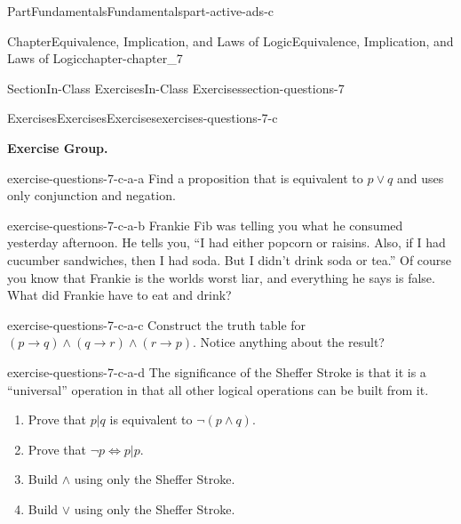 \documentclass[oneside,10pt,]{book}
\numberwithin{equation}{section}
\begin{document}
\begin{partptx}{Part}{Fundamentals}{}{Fundamentals}{}{}{part-active-ads-c}
\begin{chapterptx}{Chapter}{Equivalence, Implication, and Laws of Logic}{}{Equivalence, Implication, and Laws of Logic}{}{}{chapter-chapter_7}
%
%
\typeout{************************************************}
\typeout{************************************************}
%
\begin{sectionptx}{Section}{In-Class Exercises}{}{In-Class Exercises}{}{}{section-questions-7}
%
%
%
\typeout{************************************************}
\typeout{************************************************}
%
\begin{exercises-subsection-numberless}{Exercises}{Exercises}{}{Exercises}{}{}{exercises-questions-7-c}
\par\medskip\noindent%
\textbf{Exercise Group.}\space\space%
\begin{exercisegroup}
\begin{divisionexerciseeg}{1}{}{}{exercise-questions-7-c-a-a}%
Find a proposition that is equivalent to \(p \lor  q\) and uses only conjunction and negation.%
\end{divisionexerciseeg}%
\begin{divisionexerciseeg}{2}{}{}{exercise-questions-7-c-a-b}%
Frankie Fib was telling you what he consumed yesterday afternoon. He tells you, ``I had either popcorn or raisins. Also, if I had cucumber sandwiches, then I had soda. But I didn't drink soda or tea.'' Of course you know that Frankie is the worlds worst liar, and everything he says is false. What did Frankie have to eat and drink?%
\end{divisionexerciseeg}%
\begin{divisionexerciseeg}{3}{}{}{exercise-questions-7-c-a-c}%
Construct the truth table for \((p \rightarrow q) \land (q \rightarrow r) \land (r \rightarrow p)\).   Notice anything about the result?%
\end{divisionexerciseeg}%
\begin{divisionexerciseeg}{4}{}{}{exercise-questions-7-c-a-d}%
The significance of the Sheffer Stroke is that it is a ``universal'' operation in that all other logical operations can be built from it.%
\begin{enumerate}[label=(\alph*)]
\item{}Prove that \(p | q\) is equivalent to \(\neg (p \land  q)\).%
\item{}Prove that \(\neg p \Leftrightarrow  p | p\).%
\item{}Build \(\land\) using only the Sheffer Stroke.%
\item{}Build \(\lor\) using only the Sheffer Stroke.%
\end{enumerate}

\end{divisionexerciseeg}
\end{exercisegroup}
\end{exercises-subsection-numberless}
\end{sectionptx}
\end{chapterptx}
\end{partptx}
\end{document}
